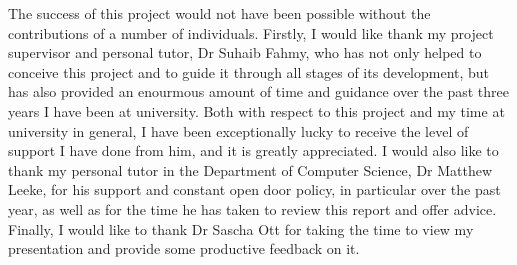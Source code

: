 The success of this project would not have been possible without the contributions of a number of individuals.
Firstly, I would like thank my project supervisor and personal tutor, Dr Suhaib Fahmy, who has not only helped to conceive this project and to guide it through all stages of its development, but has also provided an enourmous amount of time and guidance over the past three years I have been at university.
Both with respect to this project and my time at university in general, I have been exceptionally lucky to receive the level of support I have done from him, and it is greatly appreciated.
I would also like to thank my personal tutor in the Department of Computer Science, Dr Matthew Leeke, for his support and constant open door policy, in particular over the past year, as well as for the time he has taken to review this report and offer advice.
Finally, I would like to thank Dr Sascha Ott for taking the time to view my presentation and provide some productive feedback on it.
